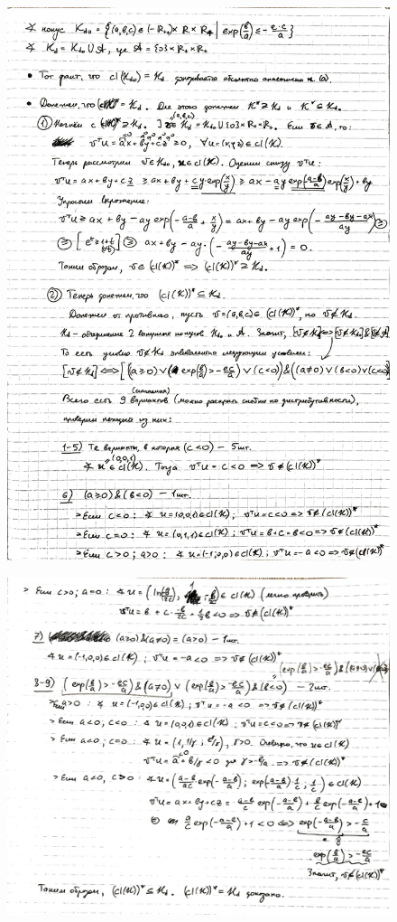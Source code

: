\documentclass[a4paper,12pt]{article}
\begin{document}
	\begin{figure}[h!]
		\centering
		\includegraphics[width=0.82\linewidth]{figures/cone_1}
	\end{figure}
	\newpage
	\begin{figure}[h!]
		\centering
		\includegraphics[width=0.82\linewidth]{figures/cone_2}
	\end{figure}
	
	
\end{document}
